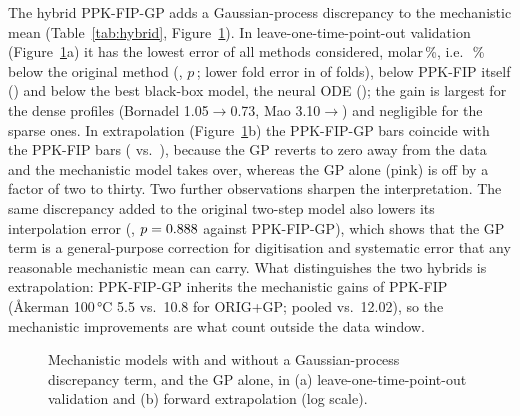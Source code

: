 The hybrid PPK-FIP-GP adds a Gaussian-process discrepancy to the mechanistic mean (Table~\ref{tab:hybrid}, Figure~\ref{fig:hybrid}). In leave-one-time-point-out validation (Figure~\ref{fig:hybrid}a) it has the lowest error of all methods considered, \HybLotoAll{} molar\,\%, i.e.\ \HybLotoRedOrig\,\% below the original method (\LotoAllOrig, $p$\,\HybLotoPOrig; lower fold error in \FoldHybWinsOrig{} of \FoldN{} folds), below PPK-FIP itself (\HybLotoBase) and below the best black-box model, the neural ODE (\LotoBBNODE); the gain is largest for the dense profiles (Bornadel 1.05$\to$0.73, Mao 3.10$\to$\HybLotoMao) and negligible for the sparse ones. In extrapolation (Figure~\ref{fig:hybrid}b) the PPK-FIP-GP bars coincide with the PPK-FIP bars (\HybFcstAll{} vs.\ \HybFcstBase), because the GP reverts to zero away from the data and the mechanistic model takes over, whereas the GP alone (pink) is off by a factor of two to thirty. Two further observations sharpen the interpretation. The same discrepancy added to the original two-step model also lowers its interpolation error (\HybLotoOrigGP, $p=0.888$ against PPK-FIP-GP), which shows that the GP term is a general-purpose correction for digitisation and systematic error that any reasonable mechanistic mean can carry. What distinguishes the two hybrids is extrapolation: PPK-FIP-GP inherits the mechanistic gains of PPK-FIP (Åkerman 100\,°C 5.5 vs.\ 10.8 for ORIG+GP; pooled \HybFcstAll{} vs.\ 12.02), so the mechanistic improvements are what count outside the data window.
\begin{figure}[!htbp]\centering{}\caption{Mechanistic models with and without a Gaussian-process discrepancy term, and the GP alone, in (a) leave-one-time-point-out validation and (b) forward extrapolation (log scale).}\label{fig:hybrid}\end{figure}

